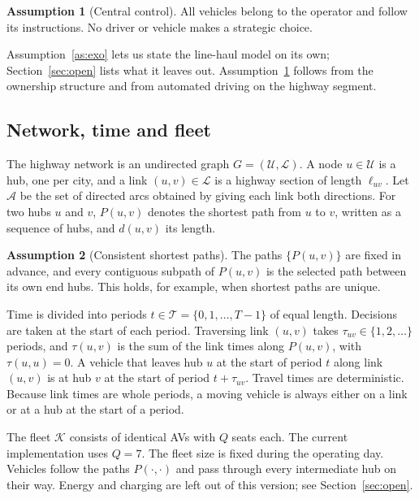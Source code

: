 \documentclass[12pt]{article}
\theoremstyle{plain}
\theoremstyle{definition}
\newtheorem{assumption}{Assumption}
\begin{document}
\begin{assumption}[Central control]\label{as:central}
All vehicles belong to the operator and follow its instructions. No driver or vehicle makes a strategic choice.
\end{assumption}

Assumption~\ref{as:exo} lets us state the line-haul model on its own; Section~\ref{sec:open} lists what it leaves out. Assumption~\ref{as:central} follows from the ownership structure and from automated driving on the highway segment.

\subsection{Network, time and fleet}

The highway network is an undirected graph $G=(\mathcal{U},\mathcal{L})$. A node $u\in\mathcal{U}$ is a hub, one per city, and a link $(u,v)\in\mathcal{L}$ is a highway section of length $\ell_{uv}$. Let $\mathcal{A}$ be the set of directed arcs obtained by giving each link both directions. For two hubs $u$ and $v$, $P(u,v)$ denotes the shortest path from $u$ to $v$, written as a sequence of hubs, and $d(u,v)$ its length.

\begin{assumption}[Consistent shortest paths]\label{as:path}
The paths $\{P(u,v)\}$ are fixed in advance, and every contiguous subpath of $P(u,v)$ is the selected path between its own end hubs. This holds, for example, when shortest paths are unique.
\end{assumption}

Time is divided into periods $t\in\mathcal{T}=\{0,1,\dots,T-1\}$ of equal length. Decisions are taken at the start of each period. Traversing link $(u,v)$ takes $\tau_{uv}\in\{1,2,\dots\}$ periods, and $\tau(u,v)$ is the sum of the link times along $P(u,v)$, with $\tau(u,u)=0$. A vehicle that leaves hub $u$ at the start of period $t$ along link $(u,v)$ is at hub $v$ at the start of period $t+\tau_{uv}$. Travel times are deterministic. Because link times are whole periods, a moving vehicle is always either on a link or at a hub at the start of a period.

The fleet $\mathcal{K}$ consists of identical AVs with $Q$ seats each. The current implementation uses $Q=7$. The fleet size is fixed during the operating day. Vehicles follow the paths $P(\cdot,\cdot)$ and pass through every intermediate hub on their way. Energy and charging are left out of this version; see Section~\ref{sec:open}.
\end{document}
